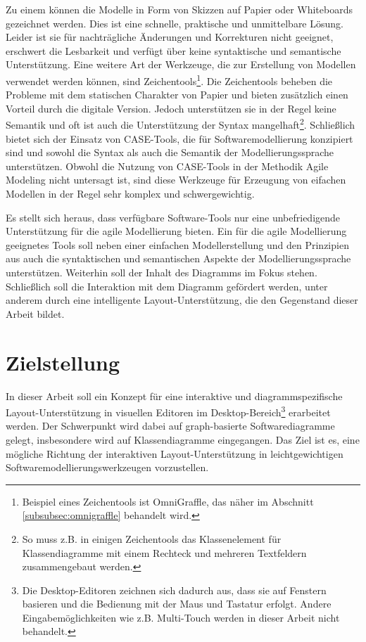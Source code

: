 Zu einem können die Modelle in Form von Skizzen auf Papier oder Whiteboards gezeichnet werden. Dies ist eine schnelle, praktische und unmittelbare Lösung. Leider ist sie für nachträgliche Änderungen und Korrekturen nicht geeignet, erschwert die Lesbarkeit und verfügt über keine syntaktische und semantische Unterstützung. Eine weitere Art der Werkzeuge, die zur Erstellung von Modellen verwendet werden können, sind Zeichentools\footnote{Beispiel eines Zeichentools ist OmniGraffle, das näher im Abschnitt \ref{subsubsec:omnigraffle} behandelt wird.}. Die Zeichentools beheben die Probleme mit dem statischen Charakter von Papier und bieten zusätzlich einen Vorteil durch die digitale Version. Jedoch unterstützen sie in der Regel keine Semantik und oft ist auch die Unterstützung der Syntax mangelhaft\footnote{So muss z.B. in einigen Zeichentools das Klassenelement für Klassendiagramme mit einem Rechteck und mehreren Textfeldern zusammengebaut werden.}. Schließlich bietet sich der Einsatz von CASE-Tools, die für Softwaremodellierung konzipiert sind und sowohl die Syntax als auch die Semantik der Modellierungssprache unterstützen. Obwohl die Nutzung von CASE-Tools in der Methodik Agile Modeling nicht untersagt ist, sind diese Werkzeuge für Erzeugung von eifachen Modellen in der Regel sehr komplex und schwergewichtig.

Es stellt sich heraus, dass verfügbare Software-Tools nur eine unbefriedigende Unterstützung für die agile Modellierung bieten. Ein für die agile Modellierung geeignetes Tools soll neben einer einfachen Modellerstellung und den Prinzipien aus \cite{Ambler02Agile} auch die syntaktischen und semantischen Aspekte der Modellierungssprache unterstützen. Weiterhin soll der Inhalt des Diagramms im Fokus stehen. Schließlich soll die Interaktion mit dem Diagramm gefördert werden, unter anderem durch eine intelligente Layout-Unterstützung, die den Gegenstand dieser Arbeit bildet.

\section{Zielstellung}

In dieser Arbeit soll ein Konzept für eine interaktive und diagrammspezifische Layout-Un\-ter\-stüt\-zung in visuellen Editoren im Desktop-Bereich\footnote{Die Desktop-Editoren zeichnen sich dadurch aus, dass sie auf Fenstern basieren und die Bedienung mit der Maus und Tastatur erfolgt. Andere Eingabemöglichkeiten wie z.B. Multi-Touch werden in dieser Arbeit nicht behandelt.} erarbeitet werden. Der Schwerpunkt wird dabei auf graph-basierte Softwarediagramme gelegt, insbesondere wird auf Klassendiagramme eingegangen. Das Ziel ist es, eine mögliche Richtung der interaktiven Layout-Unterstützung in leichtgewichtigen Softwaremodellierungswerkzeugen vorzustellen.

